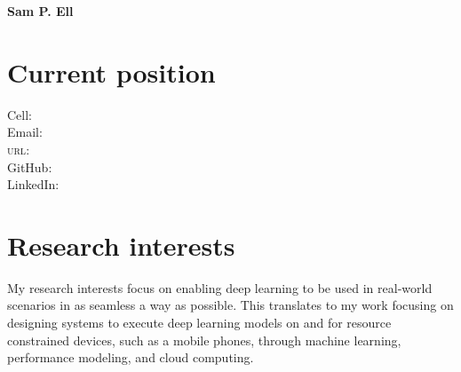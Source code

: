 \documentclass[11pt]{article} %
\begin{document}


{\LARGE\bfseries Sam P. Ell}\\ %

\begin{minipage}[t]{0.5\textwidth}
%
\section*{Current position}
%
\end{minipage}
\begin{minipage}[t]{0.5\textwidth}
\begin{flushright}
%
\smallskip
Cell:  \\%
Email: \\ %
\textsc{url}: \\ %
GitHub: \\
LinkedIn: \\
%
\end{flushright}
\end{minipage}



\section*{Research interests}

My research interests focus on enabling deep learning to be used in real-world scenarios in as seamless a way as possible.
This translates to my work focusing on designing systems to execute deep learning models on and for resource constrained devices, such as a mobile phones, through machine learning, performance modeling, and cloud computing.


\end{document}
